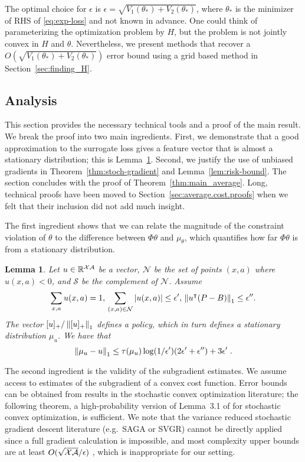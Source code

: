 \documentclass[11pt]{article}
\newtheorem{lemma}[theorem]{Lemma}
\begin{document}
The optimal choice for $\epsilon$ is $\epsilon=\sqrt{V_1(\theta_*) + V_2(\theta_*)}$, where $\theta_*$ is the minimizer of RHS of \eqref{eq:exp-loss} and not known in advance. One could think of parameterizing the optimization problem by $H$, but the problem is not jointly convex in $H$ and $\theta$. Nevertheless, we present methods that recover a $O(\sqrt{V_1(\theta_*) + V_2(\theta_*)})$ error bound using a grid based method in Section~\ref{sec:finding_H}.


\subsection{Analysis}
  This section provides the necessary technical tools and a proof of the main result. We break the proof into two main ingredients. First, we demonstrate that a good approximation to the surrogate loss gives a feature vector that is almost a stationary distribution; this is Lemma~\ref{lem:V.to.stationary.distribution}.
Second, we justify the use of unbiased gradients in Theorem~\ref{thm:stoch-gradient} and Lemma~\ref{lem:risk-bound}. The section concludes with the proof of Theorem~\ref{thm:main_average}. Long, technical proofs have been moved to Section~\ref{sec:average.cost.proofs} when we felt that their inclusion did not add much insight. 

  The first ingredient shows that we can relate the magnitude of the constraint violation of $\theta$ to the difference between $\Phi\theta$ and $\mu_\theta$, which quantifies how far $\Phi\theta$ is from a stationary distribution.
\begin{lemma}
\label{lem:V.to.stationary.distribution}
Let $u\in \mathbb R^{{\cal X} {\cal A}}$ be a vector, $\mathcal N$ be the set of points $(x,a)$ where $u (x,a)<0$, and $\mathcal S$ be the complement of $\mathcal N$.
Assume
\[
\sum_{x,a} u (x,a) = 1,\, \sum_{(x,a)\in \mathcal N } \left\vert u(x,a)\right\vert \le \epsilon',\, \left\Vert u^\intercal (P-B)\right\Vert_1\le \epsilon'' .
\]
The vector $[u]_+/\left\Vert[u]_+\right\Vert_1$ defines a policy, which in turn defines a stationary distribution $ \mu_{u}$. We have that
\[
\left\Vert \mu_{u} - u\right\Vert_1 \le \tau(\mu_u) \log(1/\epsilon') (2\epsilon'+\epsilon'') + 3\epsilon' \; .
\]
\end{lemma}

The second ingredient is the validity of the subgradient estimates. We assume access to estimates of the subgradient of a convex cost function. Error bounds can be obtained from results in the stochastic convex optimization literature; the following theorem, a high-probability version of Lemma~3.1 of \citet{Flaxman-Kalai-McMahan-2005} for stochastic convex optimization, is sufficient. We note that the variance reduced stochastic gradient descent literature (e.g.\ SAGA or SVGR) cannot be directly applied since a full gradient calculation is impossible, and most complexity upper bounds are at least $O(\sqrt{{\cal X}{\cal A}}/\epsilon)$ \citep{xiao2014proximal}, which is inappropriate for our setting.
\end{document}
